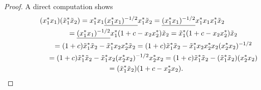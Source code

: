 \documentclass[pdftex]{sigma}
\begin{document}
\begin{proof}A direct computation shows
\begin{gather*}
( x_{1}^{\ast}x_{1}) ( \tilde{x}_{1}^{\ast}\tilde{x}_{2}) =x_{1}^{\ast}x_{1}\underline{( x_{1}^{\ast}x_{1})
^{-1/2}}x_{1}^{\ast}\tilde{x}_{2}=\underline{( x_{1}^{\ast}x_{1})
^{-1/2}}x_{1}^{\ast}x_{1}x_{1}^{\ast}\tilde{x}_{2}%
\\
\hphantom{( x_{1}^{\ast}x_{1}) ( \tilde{x}_{1}^{\ast}\tilde{x}_{2})}{}
=\underline{( x_{1}^{\ast}x_{1}) ^{-1/2}}x_{1}^{\ast}(
1+c-x_{2}x_{2}^{\ast}) \tilde{x}_{2}=\tilde{x}_{1}^{\ast}(
1+c-x_{2}x_{2}^{\ast}) \tilde{x}_{2}\\
\hphantom{( x_{1}^{\ast}x_{1}) ( \tilde{x}_{1}^{\ast}\tilde{x}_{2})}{}
=( 1+c) \tilde{x}%
_{1}^{\ast}\tilde{x}_{2}-\tilde{x}_{1}^{\ast}x_{2}x_{2}^{\ast}\tilde{x}_{2}
=( 1+c) \tilde{x}_{1}^{\ast}\tilde{x}_{2}-\tilde{x}_{1}^{\ast
}x_{2}x_{2}^{\ast}x_{2}( x_{2}^{\ast}x_{2}) ^{-1/2}\\
\hphantom{( x_{1}^{\ast}x_{1}) ( \tilde{x}_{1}^{\ast}\tilde{x}_{2})}{}
=(1+c) \tilde{x}_{1}^{\ast}\tilde{x}_{2}-\tilde{x}_{1}^{\ast}x_{2}(
x_{2}^{\ast}x_{2}) ^{-1/2}x_{2}^{\ast}x_{2}
=( 1+c) \tilde{x}_{1}^{\ast}\tilde{x}_{2}-( \tilde{x}%
_{1}^{\ast}\tilde{x}_{2}) ( x_{2}^{\ast}x_{2}) \\
\hphantom{( x_{1}^{\ast}x_{1}) ( \tilde{x}_{1}^{\ast}\tilde{x}_{2})}{}
=(\tilde{x}_{1}^{\ast}\tilde{x}_{2}) ( 1+c-x_{2}^{\ast}x_{2}) .\tag*{\qed}
\end{gather*}
\renewcommand{\qed}{}
\end{proof}
\end{document}
